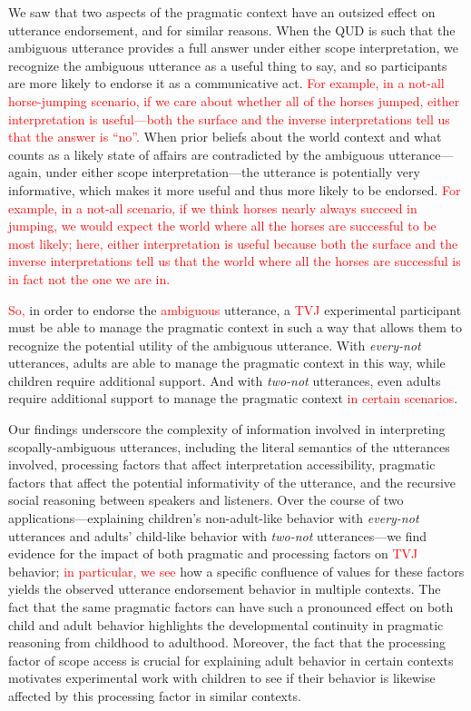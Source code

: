\documentclass[preprint,authoryear]{elsarticle}\frenchspacing
\newcommand{\lp}[1]{\textcolor{red}{#1}} %
\begin{document}
We saw that two aspects of the pragmatic context have an outsized effect on utterance endorsement, and for similar reasons. When the QUD is such that the ambiguous utterance provides a full answer under either scope interpretation, we recognize the ambiguous utterance as a useful thing to say, and so participants are more likely to endorse it as a communicative act. 
\lp{For example, in a not-all horse-jumping scenario, if we care about whether all of the horses jumped, either interpretation is useful---both the surface %
and the inverse %
interpretations tell us that the answer is ``no''.}
When prior beliefs about the world context and what counts as a likely state of affairs are contradicted by the ambiguous utterance---again, under either scope interpretation---the utterance is potentially very informative, which makes it more useful and thus more likely to be endorsed. 
\lp{For example, in a not-all scenario, if we think horses nearly always succeed in jumping, we would expect the world where all the horses are successful to be most likely; here, either interpretation is useful because both the surface %
and the inverse %
interpretations
tell us that the world where all the horses are successful is in fact not the one we are in.}

\lp{So,} in order to endorse the \lp{ambiguous} utterance, a \lp{TVJ} experimental participant must be able to manage the pragmatic context in such a way that allows them to recognize the potential utility of the ambiguous utterance. With \emph{every-not} utterances, adults are able to manage the pragmatic context in this way, while children require additional support. And with \emph{two-not} utterances, even adults require additional support to manage the pragmatic context \lp{in certain scenarios}.

Our findings underscore the complexity of information involved in interpreting scopally-ambiguous utterances, including the literal semantics of the utterances involved, processing factors that affect interpretation accessibility, pragmatic factors that affect the potential informativity of the utterance, and the recursive social reasoning between speakers and listeners. Over the course of two applications---explaining children's non-adult-like behavior with \emph{every-not} utterances and adults' child-like behavior with \emph{two-not} utterances---we find evidence for the impact of both pragmatic and processing factors on 
\lp{TVJ}
behavior; \lp{in particular,} \lp{we see} how a specific confluence of values for these factors yields the observed utterance endorsement behavior in multiple contexts. The fact that the same pragmatic factors can have such a pronounced effect on both child and adult behavior highlights the developmental continuity in pragmatic reasoning from childhood to adulthood. Moreover, the fact that the processing factor of scope access is crucial for explaining adult behavior in certain contexts motivates experimental work with children to see if their behavior is likewise affected by this processing factor in similar contexts. 
\end{document}
